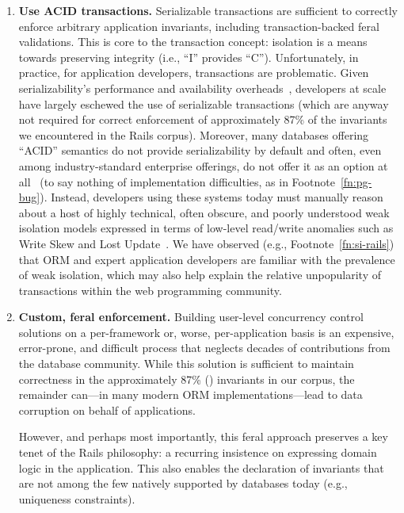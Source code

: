 \begin{enumerate}
\item \textbf{Use ACID transactions.} Serializable transactions are
  sufficient to correctly enforce arbitrary application invariants,
  including transaction-backed feral validations. This is core to the
  transaction concept: isolation is a means towards preserving
  integrity (i.e., ``I'' provides ``C'').
  Unfortunately, in practice, for application developers, transactions
  are problematic. Given serializability's performance and
  availability overheads~\cite{brewer-cap}, developers at scale have
  largely eschewed the use of serializable transactions (which are
  anyway not required for correct enforcement of approximately 87\% of
  the invariants we encountered in the Rails corpus). Moreover, many
  databases offering ``ACID'' semantics do not provide serializability
  by default and often, even among industry-standard enterprise
  offerings, do not offer it as an option at all~\cite{hat-vldb} (to
  say nothing of implementation difficulties, as in
  Footnote~\ref{fn:pg-bug}). Instead, developers using these systems
  today must manually reason about a host of highly technical, often
  obscure, and poorly understood weak isolation models expressed in
  terms of low-level read/write anomalies such as Write Skew and Lost
  Update~\cite{adya,consistency-borders}. We have observed
  (e.g., Footnote~\ref{fn:si-rails}) that ORM and expert application
  developers are familiar with the prevalence of weak isolation, which
  may also help explain the relative unpopularity of transactions
  within the web programming community.

\item\textbf{Custom, feral enforcement.} Building user-level
  concurrency control solutions on a per-framework or, worse,
  per-application basis is an expensive, error-prone, and difficult
  process that neglects decades of contributions from the database 
  community. While this solution is sufficient to maintain correctness
  in the approximately 87\% (\iconfluent) invariants in our corpus, the remainder
  can---in many modern ORM implementations---lead to data corruption on
  behalf of applications. 

  However, and perhaps most importantly, this feral approach preserves
  a key tenet of the Rails philosophy: a recurring insistence on
  expressing domain logic in the application. This also enables the
  declaration of invariants that are not among the few natively
  supported by databases today (e.g., uniqueness constraints).
\end{enumerate}

